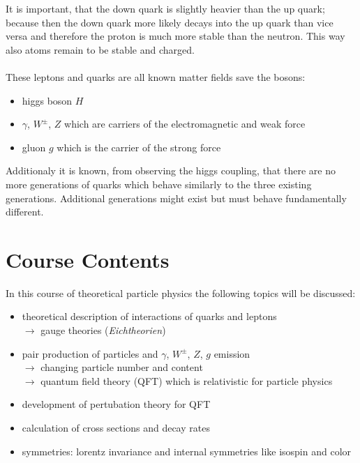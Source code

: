 \documentclass{include/thesisclass}
\newcommand{\df}{\rightarrow}
\begin{document}
It is important, that the down quark is slightly heavier than the up quark; because then the down quark more likely decays into the up quark than vice versa and therefore the proton is much more stable than the neutron. This way also atoms remain to be stable and charged.\\
\\
These leptons and quarks are all known matter fields save the bosons:
\begin{itemize}
\item higgs boson $H$
\item $\gamma$, $W^\pm$, $Z$ which are carriers of the electromagnetic and weak force
\item gluon $g$ which is the carrier of the strong force
\end{itemize}
Additionaly it is known, from observing the higgs coupling, that there are no more generations of quarks which behave similarly to the three existing generations. Additional generations might exist but must behave fundamentally different.

\section{Course Contents}
In this course of theoretical particle physics the following topics will be discussed:
\begin{itemize}
\item theoretical description of interactions of quarks and leptons\\
$\df$ gauge theories (\textit{Eichtheorien})
\item pair production of particles and $\gamma$, $W^\pm$, $Z$, $g$ emission\\
$\df$ changing particle number and content\\
$\df$ quantum field theory (QFT) which is relativistic for particle physics
\item development of pertubation theory for QFT
\item calculation of cross sections and decay rates
\item symmetries: lorentz invariance and internal symmetries like isospin and color
\end{itemize} 
\end{document}

